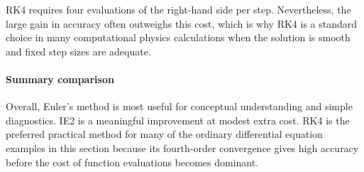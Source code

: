 RK4 requires four evaluations of the right-hand side per step. Nevertheless, the
large gain in accuracy often outweighs this cost, which is why RK4 is a standard
choice in many computational physics calculations when the solution is smooth
and fixed step sizes are adequate.

\paragraph{Summary comparison}
Overall, Euler's method is most useful for conceptual understanding and simple
diagnostics. IE2 is a meaningful improvement at modest extra cost. RK4 is the
preferred practical method for many of the ordinary differential equation
examples in this section because its fourth-order convergence gives high
accuracy before the cost of function evaluations becomes dominant.
